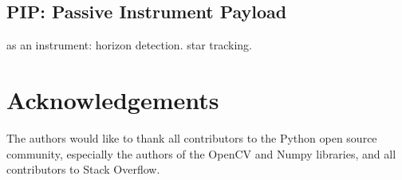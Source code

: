 \documentclass[conference]{IEEEtran} %
\begin{document}
\subsection{PIP: Passive Instrument Payload}
\label{subsec:pip}
as an instrument: horizon detection. star tracking.

\section*{Acknowledgements}
The authors would like to thank all contributors to the Python open source community, especially the authors of the OpenCV and Numpy libraries, and all contributors to Stack Overflow.




\onecolumn
\appendices{}
\end{document}
